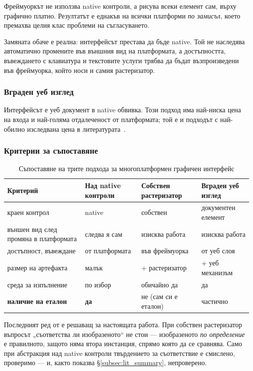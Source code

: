 Фреймуоркът не използва native контроли, а рисува всеки елемент сам, върху графично
платно. Резултатът е еднакъв на всички платформи \emph{по замисъл}, което премахва целия
клас проблеми на съгласуването.

Замяната обаче е реална: интерфейсът престава да бъде native. Той не наследява
автоматично промените във външния вид на платформата, а достъпността, въвеждането с
клавиатура и текстовите услуги трябва да бъдат възпроизведени във фреймуорка, който носи
и самия растеризатор.

\subsubsection{Вграден уеб изглед}

Интерфейсът е уеб документ в native обвивка. Този подход има най-ниска цена на входа и
най-голяма отдалеченост от платформата; той е и подходът с най-обилно изследвана цена в
литературата~\cite{biornhansen2020overhead}.

\subsubsection{Критерии за съпоставяне}

\begin{table}[H]
\caption{Съпоставяне на трите подхода за многоплатформен графичен интерфейс}
\label{tab:approaches}
\centering\small
\begin{tabular}{@{}L{3.3cm}L{3.3cm}L{3.3cm}L{3.3cm}@{}}
\hline
\textbf{Критерий} & \textbf{Над native контроли} & \textbf{Собствен растеризатор} & \textbf{Вграден уеб изглед} \\
\hline
краен контрол & native & собствен & документен елемент \\
външен вид след промяна в платформата & следва я сам & изисква работа & изисква работа \\
достъпност, въвеждане & от платформата & във фреймуорка & от уеб слоя \\
размер на артефакта & малък & + растеризатор & + уеб механизъм \\
среда за изпълнение & по избор & обичайно да & да \\
\textbf{наличие на еталон} & \textbf{да} & не (сам си е еталон) & частично \\
\hline
\end{tabular}
\end{table}

Последният ред от  е решаващ за настоящата работа. При собствен растеризатор въпросът
„съответства ли изобразеното“ не стои --- изобразеното \emph{по определение} е
правилното, защото няма втора инстанция, спрямо която да се сравнява. Само при абстракция
над native контроли твърдението за съответствие е смислено, проверимо --- и, както
показва §\ref{subsec:lit_summary}, непроверено.

